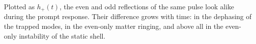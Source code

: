 \begin{learned}
Plotted as $h_+(t)$, the even and odd reflections of the same pulse look alike during the prompt response. Their
difference grows with time: in the dephasing of the trapped modes, in the even-only matter ringing, and above all in the
even-only instability of the static shell.
\end{learned}
